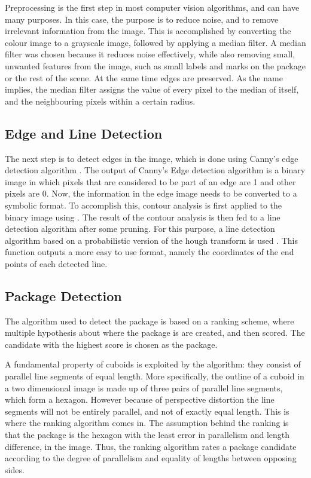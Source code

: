 Preprocessing is the first step in most computer vision algorithms, and can have many purposes. 
In this case, the purpose is to reduce noise, and to remove irrelevant information from the image.
This is accomplished by converting the colour image to a grayscale image, followed by applying a median filter. 
A median filter was chosen because it reduces noise effectively, while also removing small, unwanted features from the image, such as small labels and marks on the package or the rest of the scene.
At the same time edges are preserved.
As the name implies, the median filter assigns the value of every pixel to the median of itself, and the neighbouring pixels within a certain radius. %

\subsection{Edge and Line Detection} %
The next step is to detect edges in the image, which is done using Canny's edge detection algorithm \cite{canny}.
The output of Canny's Edge detection algorithm is a binary image in which pixels that are considered to be part of an edge are 1 and other pixels are 0.
Now, the information in the edge image needs to be converted to a symbolic format.
To accomplish this, contour analysis is first applied to the binary image using \cite{suzuki}.
The result of the contour analysis is then fed to a line detection algorithm after some pruning.
For this purpose, a line detection algorithm based on a probabilistic version of the hough transform is used \cite{houghp}.
This function outputs a more easy to use format, namely the coordinates of the end points of each detected line.

\subsection{Package Detection}

The algorithm used to detect the package is based on a ranking scheme, where multiple hypothesis about where the package is are created, and then scored. 
The candidate with the highest score is chosen as the package. 

A fundamental property of cuboids is exploited by the algorithm: they consist of parallel line segments of equal length. 
More specifically, the outline of a cuboid in a two dimensional image is made up of three pairs of parallel line segments, which form a hexagon. 
However because of perspective distortion the line segments will not be entirely parallel, and not  of exactly equal length.
This is where the ranking algorithm comes in.
The assumption behind the ranking is that the package is the hexagon with the least error in parallelism and length difference, in the image.
Thus, the ranking algorithm rates a package candidate according to the degree of parallelism and equality of lengths between opposing sides.

